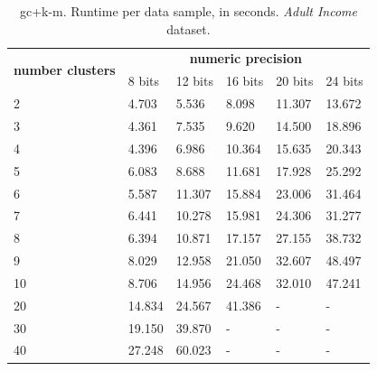 \begin{table}[htp]
\centering
\caption{\acs{gc}+\acs{k-m}. Runtime per data sample, in seconds. \emph{Adult Income} dataset.}
\label{table:runtimeKMAI}
\begin{tabular}{|l|l|l|l|l|l|}
\hline
\multirow{2}{*}{\textbf{number clusters}} & \multicolumn{5}{c|}{\textbf{numeric precision}}                                              \\ \cline{2-6}
                                          & 8 bits & 12 bits & 16 bits & 20 bits & 24 bits \\ \hline
2                                & 4.703           & 5.536            & 8.098            & 11.307           & 13.672           \\ \hline
3                                & 4.361           & 7.535            & 9.620            & 14.500           & 18.896           \\ \hline
4                                & 4.396           & 6.986            & 10.364           & 15.635           & 20.343           \\ \hline
5                                & 6.083           & 8.688            & 11.681           & 17.928           & 25.292           \\ \hline
6                                & 5.587           & 11.307           & 15.884           & 23.006           & 31.464           \\ \hline
7                                & 6.441           & 10.278           & 15.981           & 24.306           & 31.277           \\ \hline
8                                & 6.394           & 10.871           & 17.157           & 27.155           & 38.732           \\ \hline
9                                & 8.029           & 12.958           & 21.050           & 32.607           & 48.497           \\ \hline
10                               & 8.706           & 14.956           & 24.468           & 32.010           & 47.241           \\ \hline
20                               & 14.834          & 24.567           & 41.386           & -                & -                \\ \hline
30                               & 19.150          & 39.870           & -                & -                & -                \\ \hline
40                               & 27.248          & 60.023           & -                & -                & -                \\ \hline

\end{tabular}
\end{table}
